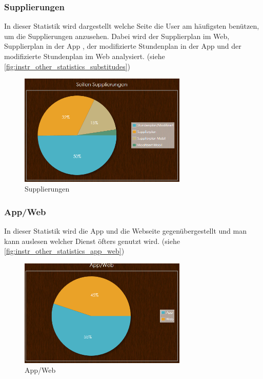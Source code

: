 \subsubsection{Supplierungen}
In dieser Statistik wird dargestellt welche Seite die User am häufigsten benützen, um die Supplierungen anzusehen. Dabei wird der Supplierplan im Web, Supplierplan in der App , der modifizierte Stundenplan in der App und der modifizierte Stundenplan im Web analysiert. (siehe \autoref{fig:instr_other_statistics_substitudes})
\begin{figure}[H]
\centering
\includegraphics[keepaspectratio=true, width=8cm]{images/screenshots/statistics_substitudes.png}
\caption{Supplierungen}
\label{fig:instr_other_statistics_substitudes}
\end{figure}
\subsubsection{App/Web}
In dieser Statistik wird die App und die Webseite gegenübergestellt und man kann auslesen welcher Dienst öfters genutzt wird. (siehe \autoref{fig:instr_other_statistics_app_web})
\begin{figure}[H]
\centering
\includegraphics[keepaspectratio=true, width=8cm]{images/screenshots/statistics_app_web.png}
\caption{App/Web}
\label{fig:instr_other_statistics_app_web}
\end{figure}
